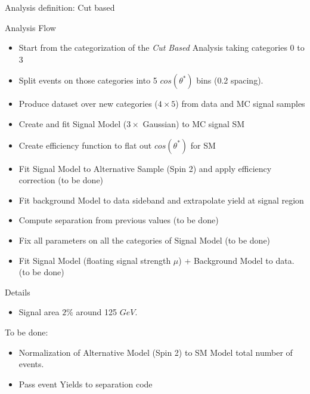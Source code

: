 \documentclass[8pt]{beamer}
\begin{document}
\begin{frame}{Analysis definition: Cut based}

  \begin{block}{Analysis Flow}
 
    \begin{itemize}
      \item Start from the categorization of the \textit{Cut Based} Analysis taking categories 0 to 3 
      \item Split events on those categories into 5 $cos(\theta^*)$ bins (0.2 spacing).
      \item Produce dataset over new categories ($4 \times 5$) from data and MC signal samples
      \item Create and fit Signal Model ($3 \times$ Gaussian) to MC signal SM 
      \item Create efficiency function to flat out $cos(\theta^*)$ for SM 
      \item Fit Signal Model to Alternative Sample (Spin 2) and apply efficiency correction (to be done)
      \item Fit background Model to data sideband and extrapolate yield at signal region
      \item Compute separation from previous values (to be done)
      \item Fix all parameters on all the categories of Signal Model (to be done)
      \item Fit Signal Model (floating signal strength $\mu$) + Background Model to data. (to be done)
    \end{itemize}
 
  \end{block}

    \begin{block}{Details}
 
    \begin{itemize}
      \item Signal area $2\%$ around 125 $GeV$.
    \end{itemize}
 
    \end{block}

    \begin{block}{To be done:}
 
    \begin{itemize}
      \item Normalization of Alternative Model (Spin 2) to SM Model total number of events.
      \item Pass event Yields to separation code 
    \end{itemize}
 
    \end{block}

\end{frame}
\end{document}
